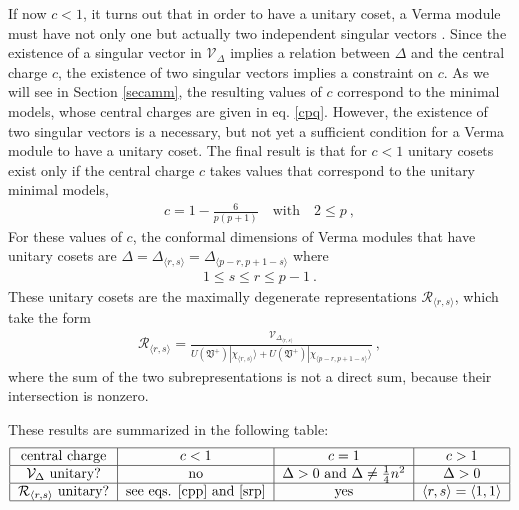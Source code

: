 \documentclass[12pt, a4paper, notitlepage, twoside]{report}
\numberwithin{equation}{section}
\theoremstyle{break}
\begin{document}
If now $c<1$, it turns out that in order to have a unitary coset, a Verma module must have not only one but actually two independent singular vectors \cite{fms97}. 
Since the existence of a singular vector in $\mathcal{V}_\Delta$ implies a relation between $\Delta$ and the central charge $c$, the existence of two singular vectors implies a constraint on $c$. 
As we will see in Section \ref{secamm}, the resulting values of $c$ correspond to the minimal models, whose central charges are given in eq. \eqref{cpq}. 
However, the existence of two singular vectors is a necessary, but not yet a sufficient condition for a Verma module to have a unitary coset.
The final result is that for $c<1$ unitary cosets exist only if the central charge $c$ takes values that correspond to the unitary minimal models,
\begin{align}
 c = 1-\frac{6}{p(p+1)}  \quad \text{with} \quad 2\leq p\ ,
\label{cpp}
\end{align}
For these values of $c$,
the conformal dimensions of Verma modules that have unitary cosets are $\Delta=\Delta_{\langle r,s \rangle}=\Delta_{\langle p-r, p+1-s \rangle}$ where
\begin{align}
   1\leq s\leq r\leq p-1 \ .
\label{srp}
\end{align}
These unitary cosets are the maximally degenerate representations $\mathcal{R}_{\langle r,s \rangle}$, which take the form
\begin{align}
 \mathcal{R}_{\langle r,s \rangle} = \frac{\mathcal{V}_{\Delta_{\langle r,s \rangle}}}{U(\mathfrak{V}^+)|\chi_{\langle r,s \rangle}\rangle + U(\mathfrak{V}^+)|\chi_{\langle p-r,p+1-s \rangle}\rangle}\ ,
\label{rrs}
\end{align}
where the sum of the two subrepresentations is not a direct sum, because their intersection is nonzero. 

These results are summarized in the following table:
\begin{align}
 \begin{tabular}{|c|c|c|c|}
  \hline
central charge & $c<1$ & $c=1$ & $c>1$
\\
\hline
$\mathcal{V}_\Delta$ unitary? & no & $\Delta>0$ and $\Delta \neq \frac14 n^2$ & $\Delta>0$
\\
\hline
$\mathcal{R}_{\langle r,s\rangle}$ unitary? & see eqs. \eqref{cpp} and \eqref{srp} &  yes & $\langle r,s \rangle = \langle 1,1\rangle$
\\
\hline
 \end{tabular}
\end{align}
\end{document}
